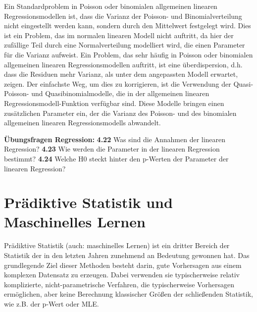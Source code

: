 \documentclass[a4paper,twoside]{tufte-book}\usepackage[]{graphicx}\usepackage[]{color}
\begin{document}
Ein Standardproblem in Poisson oder binomialen allgemeinen linearen Regressionsmodellen ist, dass die Varianz der Poisson- und Binomialverteilung nicht eingestellt werden kann, sondern durch den Mittelwert festgelegt wird. Dies ist ein Problem, das im normalen linearen Modell nicht auftritt, da hier der zufällige Teil durch eine Normalverteilung modelliert wird, die einen Parameter für die Varianz aufweist. Ein Problem, das sehr häufig in Poisson oder binomialen allgemeinen linearen Regressionsmodellen auftritt, ist eine überdispersion, d.h. dass die Residuen mehr Varianz, als unter dem angepassten Modell erwartet, zeigen.  Der einfachste Weg, um dies zu korrigieren, ist die Verwendung der Quasi-Poisson- und Quasibinomialmodelle, die in der allgemeinen linearen Regressionsmodell-Funktion verfügbar sind. Diese Modelle bringen einen zusätzlichen Parameter ein, der die Varianz des Poisson- und des binomialen allgemeinen linearen Regressionsmodells abwandelt.

\vspace{1cm}
\begin{fullwidth}
    
\textbf{Übungsfragen Regression:} 
\textbf{4.22} Was sind die Annahmen der linearen Regression?
\textbf{4.23} Wie werden die Parameter in der linearen Regression bestimmt?
\textbf{4.24} Welche H0 steckt hinter den p-Werten der Parameter der linearen Regression?

\end{fullwidth}


\chapter{Prädiktive Statistik und Maschinelles Lernen}\label{ch: Prädiktive Statistik}

Prädiktive Statistik (auch: maschinelles Lernen) ist ein dritter Bereich der Statistik der in den letzten Jahren zunehmend an Bedeutung gewonnen hat. Das grundlegende Ziel dieser Methoden besteht darin, gute Vorhersagen aus einem komplexen Datensatz zu erzeugen. Dabei verwenden sie typischerweise relativ komplizierte, nicht-parametrische Verfahren, die typischerweise Vorhersagen ermöglichen, aber keine Berechnung klassischer Größen der schließenden Statistik, wie z.B. der p-Wert oder MLE. 
\end{document}
